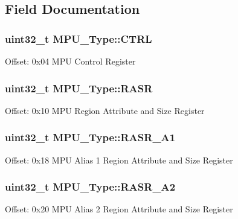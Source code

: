 \subsection{Field Documentation}
\subsubsection[{\texorpdfstring{C\+T\+RL}{CTRL}}]{ uint32\+\_\+t M\+P\+U\+\_\+\+Type\+::\+C\+T\+RL}\hypertarget{structMPU__Type_aab33593671948b93b1c0908d78779328}{}\label{structMPU__Type_aab33593671948b93b1c0908d78779328}
Offset\+: 0x04 M\+PU Control Register 
\subsubsection[{\texorpdfstring{R\+A\+SR}{RASR}}]{ uint32\+\_\+t M\+P\+U\+\_\+\+Type\+::\+R\+A\+SR}\hypertarget{structMPU__Type_adc65d266d15ce9ba57b3d127e8267f03}{}\label{structMPU__Type_adc65d266d15ce9ba57b3d127e8267f03}
Offset\+: 0x10 M\+PU Region Attribute and Size Register 
\subsubsection[{\texorpdfstring{R\+A\+S\+R\+\_\+\+A1}{RASR_A1}}]{ uint32\+\_\+t M\+P\+U\+\_\+\+Type\+::\+R\+A\+S\+R\+\_\+\+A1}\hypertarget{structMPU__Type_a94222f9a8637b5329016e18f08af7185}{}\label{structMPU__Type_a94222f9a8637b5329016e18f08af7185}
Offset\+: 0x18 M\+PU Alias 1 Region Attribute and Size Register 
\subsubsection[{\texorpdfstring{R\+A\+S\+R\+\_\+\+A2}{RASR_A2}}]{ uint32\+\_\+t M\+P\+U\+\_\+\+Type\+::\+R\+A\+S\+R\+\_\+\+A2}\hypertarget{structMPU__Type_a0aac7727a6225c6aa00627c36d51d014}{}\label{structMPU__Type_a0aac7727a6225c6aa00627c36d51d014}
Offset\+: 0x20 M\+PU Alias 2 Region Attribute and Size Register 
